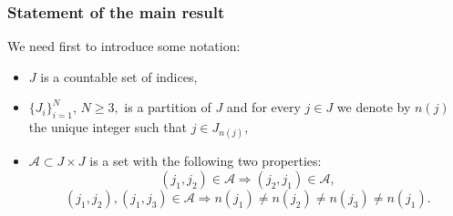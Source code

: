 \documentclass[11pt]{article}
\theoremstyle{plain}
\theoremstyle{definition}
\numberwithin{equation}{section}
\begin{document}
\subsubsection{Statement of the main result}

 We need first to introduce some notation: 
\begin{itemize}
	\item $J$ is a countable set of indices,
	\item  $\{J_{i}\}_{i=1}^N$, $N \ge 3,$ is a partition of $J$ and for every $j \in J$ we denote by $n(j)$  the unique integer such that $j\in J_{n(j)},$
	\item  $\mathcal{A}\subset J\times J$ is a set with the following two properties: 
	\begin{equation}\label{asimm}
		(j_1,j_2)\in \mathcal{A} \Longrightarrow (j_2,j_1)\in \mathcal{A},
	\end{equation}
	\begin{equation}\label{apartition}
		(j_1,j_2),(j_1,j_3)\in \mathcal{A} \Longrightarrow n(j_1)\neq n(j_2)\neq n(j_3)\neq n(j_1). 
	\end{equation}
\end{itemize}
\end{document}

